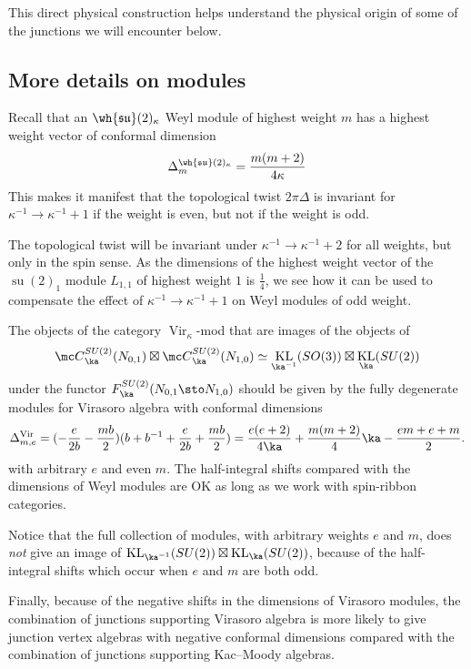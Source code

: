 \documentclass[11pt,reqno]{amsart}
\theoremstyle{plain}
\numberwithin{equation}{section}
\DeclareMathOperator{\Vir}{Vir}
\DeclareMathOperator{\tsu}{su}
\DeclareMathOperator{\KL}{KL}
\theoremstyle{definition}
\begin{document}
This direct physical construction helps understand the physical origin of some of the junctions we will encounter below. 

\subsection{More details on modules}
Recall that an $\wh{\mathfrak{su}}(2)_{\kappa}$ Weyl module of highest
weight $m$ has a highest weight vector of conformal dimension
\begin{equation}
\Delta^{\wh{\mathfrak{su}}(2)_{\kappa}}_m = \frac{m(m+2)}{4 \kappa}
\end{equation}
This makes it manifest that the topological twist $2 \pi \Delta$ is
invariant for $\kappa^{-1} \to \kappa^{-1}+1$ if the weight is even,
but not if the weight is odd.

The topological twist will be invariant under $\kappa^{-1} \to
\kappa^{-1}+2$ for all weights, but only in the spin sense. As the
dimensions of the highest weight vector of the $\tsu(2)_1$ module
$L_{1,1}$ of highest weight $1$ is $\frac14$, we see how it can be
used to compensate the effect of $\kappa^{-1} \to \kappa^{-1}+1$ on
Weyl modules of odd weight.

The objects of the category $\Vir_\kappa$-mod that are images of the objects of
$$
{\mc C}^{SU(2)}_\ka(N_{0,1}) \boxtimes {\mc
  C}^{SU(2)}_\ka(N_{1,0}) \simeq \KL_{\ka^{-1}}(SO(3))
\boxtimes \KL_\ka(SU(2))
$$
under the functor $F^{SU(2)}_\ka(N_{0,1}\sto N_{1,0})$ should be
given by the fully degenerate modules for Virasoro algebra with
conformal dimensions
\begin{equation}
\Delta^{\Vir}_{m,e} = (- \frac{e}{2b}-\frac{m b}{2})(b+b^{-1} +
\frac{e}{2b}+\frac{m b}{2}) = \frac{e(e+2)}{4 \ka} + \frac{m(m+2)}{4}
\ka - \frac{e m + e + m}{2}.
\end{equation}
with arbitrary $e$ and even $m$. The half-integral shifts compared
with the dimensions of Weyl modules are OK as long as we work with
spin-ribbon categories.

Notice that the full collection of modules, with arbitrary weights $e$
and $m$, does {\it not} give an image of
$\KL_{\ka^{-1}}(SU(2))\boxtimes \KL_\ka(SU(2))$, because of the
half-integral shifts which occur when $e$ and $m$ are both odd.

Finally, because of the negative shifts in the dimensions of Virasoro
modules, the combination of junctions supporting Virasoro algebra is
more likely to give junction vertex algebras with negative conformal
dimensions compared with the combination of junctions supporting
Kac--Moody algebras.
\end{document}
